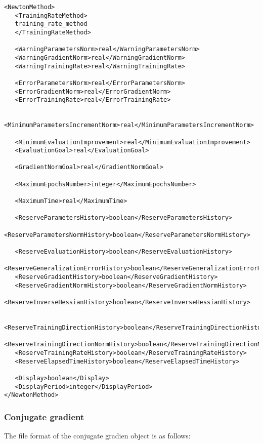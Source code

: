 \begin{lstlisting}
<NewtonMethod>
   <TrainingRateMethod>
   training_rate_method
   </TrainingRateMethod>
         
   <WarningParametersNorm>real</WarningParametersNorm>
   <WarningGradientNorm>real</WarningGradientNorm>
   <WarningTrainingRate>real</WarningTrainingRate>
   
   <ErrorParametersNorm>real</ErrorParametersNorm>
   <ErrorGradientNorm>real</ErrorGradientNorm>
   <ErrorTrainingRate>real</ErrorTrainingRate>
   
   <MinimumParametersIncrementNorm>real</MinimumParametersIncrementNorm>
 
   <MinimumEvaluationImprovement>real</MinimumEvaluationImprovement>
   <EvaluationGoal>real</EvaluationGoal>
 
   <GradientNormGoal>real</GradientNormGoal>
   
   <MaximumEpochsNumber>integer</MaximumEpochsNumber>
   
   <MaximumTime>real</MaximumTime>
   
   <ReserveParametersHistory>boolean</ReserveParametersHistory>   
   <ReserveParametersNormHistory>boolean</ReserveParametersNormHistory>

   <ReserveEvaluationHistory>boolean</ReserveEvaluationHistory>   
   <ReserveGeneralizationErrorHistory>boolean</ReserveGeneralizationErrorHistory>
   <ReserveGradientHistory>boolean</ReserveGradientHistory>
   <ReserveGradientNormHistory>boolean</ReserveGradientNormHistory>
   <ReserveInverseHessianHistory>boolean</ReserveInverseHessianHistory>
   
   <ReserveTrainingDirectionHistory>boolean</ReserveTrainingDirectionHistory>
   <ReserveTrainingDirectionNormHistory>boolean</ReserveTrainingDirectionNormHistory>
   <ReserveTrainingRateHistory>boolean</ReserveTrainingRateHistory>
   <ReserveElapsedTimeHistory>boolean</ReserveElapsedTimeHistory>
   
   <Display>boolean</Display>
   <DisplayPeriod>integer</DisplayPeriod>
</NewtonMethod>
\end{lstlisting}


\subsubsection*{Conjugate gradient}

The file format of the conjugate gradien object is as follows:

